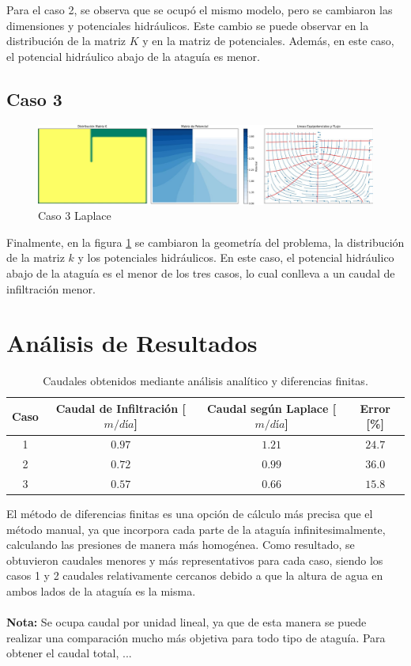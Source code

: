 Para el caso 2, se observa que se ocupó el mismo modelo, pero se cambiaron las dimensiones y potenciales hidráulicos. Este cambio se puede observar en la distribución de la matriz \(K\) y en la matriz de potenciales. Además, en este caso, el potencial hidráulico abajo de la ataguía es menor.

\subsection{Caso 3}

\begin{figure}[H]
    \centering
    \includegraphics[width=\textwidth]{GRAFICOS/laplace_caso_3.jpg}
    \caption{Caso 3 Laplace}
    \label{fig:laplace_caso_3}
\end{figure}

Finalmente, en la figura \ref{fig:laplace_caso_3} se cambiaron la geometría del problema, la distribución de la matriz \(k\) y los potenciales hidráulicos. En este caso, el potencial hidráulico abajo de la ataguía es el menor de los tres casos, lo cual conlleva a un caudal de infiltración menor.

\section{Análisis de Resultados}

\begin{table}[H]
    \centering
    \caption{Caudales obtenidos mediante análisis analítico y diferencias finitas.}
    \vspace{0.5cm}
    \begin{tabular}{cccc}
        \hline
        \textbf{Caso} & \textbf{Caudal de Infiltración [$m/día$]} & \textbf{Caudal según Laplace [$m/día$]} & \textbf{Error [\%]} \\
        \hline
        1 & $0.97$ & $1.21$ & $24.7$ \\
        2 & $0.72$ & $0.99$ & $36.0$ \\
        3 & $0.57$ & $0.66$ & $15.8$ \\
        \hline
    \end{tabular}
    \label{tab:Diferencias1}
\end{table}

El método de diferencias finitas es una opción de cálculo más precisa que el método manual, ya que incorpora cada parte de la ataguía infinitesimalmente, calculando las presiones de manera más homogénea. Como resultado, se obtuvieron caudales menores y más representativos para cada caso, siendo los casos 1 y 2 caudales relativamente cercanos debido a que la altura de agua en ambos lados de la ataguía es la misma.
\\ \\
\textbf{Nota:} Se ocupa caudal por unidad lineal, ya que de esta manera se puede realizar una comparación mucho más objetiva para todo tipo de ataguía. Para obtener el caudal total, ...
